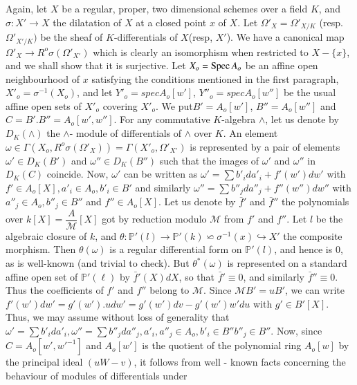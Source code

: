 Again, let $X$ be a regular, proper, two dimensional schemes over a
field $K$, and $\sigma : X' \to X$ the dilatation of $X$ at a closed
point $x$ of $X$. Let $\Omega'_{X} =  \Omega'_{X / K}$
(resp. $\Omega'_{X' / K})$ be the sheaf of $K$-differentials of
$X$(resp, $X'$). We have a canonical map $\Omega'_X \to R^o \sigma
(\Omega'_{X'})$ which is clearly an isomorphism when restricted to
$X-\{x\}$, and we shall show that it is surjective. Let $X_o = \operatorname{Spec}
A_o$ be an affine open neighbourhood of $x$ satisfying the conditions
mentioned in the first paragraph, $X'_o = \sigma^{-1}(X_o)$, and let
$Y'_o = spec A_o [w']$, $Y''_o = spec A_o[w'']$ be the usual
affine open sets of $X'_o$ covering $X'_o$. We put\pageoriginale  $B' = A _o [w']$,
$B''= A_o [w'']$ and $C= B' . B''= A_o [w', w'']$. For any
commutative $K$-algebra $\wedge$, let us denote by $D_K(\wedge)$ the
$\wedge$- module of differentials of $\wedge$ over $K$. An element
$\omega \in \Gamma (X_o, R^o \sigma (\Omega'_X)) = \Gamma(X'_o,
\Omega'_{X'})$ is represented by a pair of elements $\omega ' \in D_K
(B')$ and $\omega'' \in D_K(B'')$ such that the images of
$\omega'$ and $\omega''$  in $D_K(C)$ coincide. Now, $\omega'$ can
be written as $\omega' = \sum b'_{i} da'_i + f'(w') dw'$ with
$f' \in A_o [X], a'_i \in A_o, b'_i \in B'$ and similarly
$\omega'' = \sum b''_j da''_j + f''(w'')dw''$ with
$a''_j \in A_o, b''_j \in B''$ and $f''\in A_o [X]$. Let
us denote by $\bar{f}'$ and $\bar{f}''$ the polynomials over
$k[X]=\dfrac{A}{\mathcal{M}}[X]$ got by reduction modulo $\mathcal{M}$
from $f'$ and $f''$. Let $l$ be the algebraic closure of $k$, and
$\theta : \mathbb{P}' (l) \to \mathbb{P}'(k) \backsimeq \sigma^{-1}(x)
\hookrightarrow X'$ the composite morphism. Then $\theta (\omega)$ is
a regular differential form on $\mathbb{P}'(l)$, and hence is $0$, as
is well-known (and trivial to check). But $\theta^* (\omega)$ is
represented on a standard affine open set of $\mathbb{P}'(\ell)$ by
$\bar{f}'(X) dX$, so that $\bar{f}' \equiv 0$, and similarly
$\bar{f}'' \equiv 0$. Thus the coefficients of $f'$ and $f''$ belong
to $\mathcal{M}$. Since $\mathcal{M} B' =  u B'$, we can write $f'(w')
dw' = g'(w'). u dw' = g'(w') dv - g'(w') w' du$ with $g' \in B'
[X]$. Thus, we may assume without loss of generality that $\omega' =
\sum b'_i da'_i, \omega'' = \sum b''_j da''_j, a'_i,
a''_j \in A_o, b'_i \in B''b''_j \in B''$. Now, since
$C= A_o [w', w'^{-1}]$ and $A_o[w']$ is the quotient of the polynomial
ring $A_o[w]$ by the principal ideal $(uW-v)$, it follows from well -
known facts concerning the behaviour of modules of differentials under
